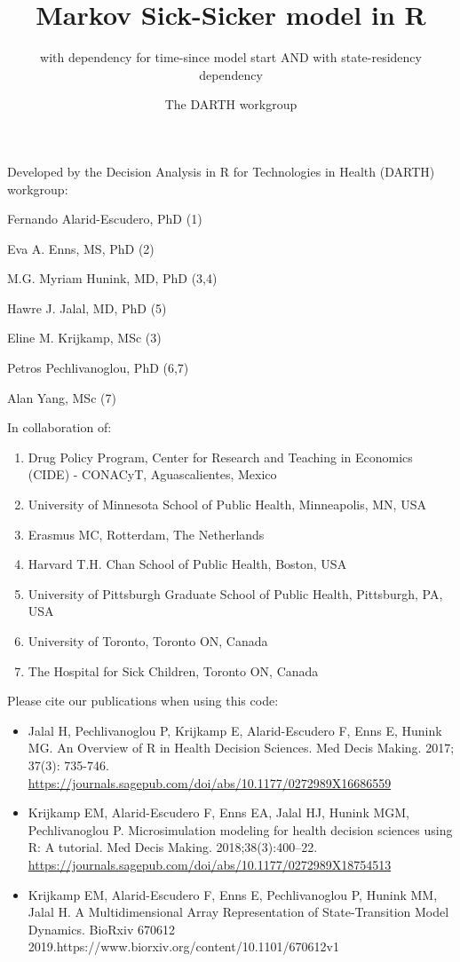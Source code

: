 \documentclass[
]{article}
\title{Markov Sick-Sicker model in R}
\subtitle{with dependency for time-since model start AND with state-residency
dependency}
\author{The DARTH workgroup}
\date{}
\providecommand{\tightlist}{%
  \setlength{\itemsep}{0pt}\setlength{\parskip}{0pt}}
\begin{document}
\maketitle

Developed by the Decision Analysis in R for Technologies in Health
(DARTH) workgroup:

Fernando Alarid-Escudero, PhD (1)

Eva A. Enns, MS, PhD (2)

M.G. Myriam Hunink, MD, PhD (3,4)

Hawre J. Jalal, MD, PhD (5)

Eline M. Krijkamp, MSc (3)

Petros Pechlivanoglou, PhD (6,7)

Alan Yang, MSc (7)

In collaboration of:

\begin{enumerate}
\def\labelenumi{\arabic{enumi}.}
\tightlist
\item
  Drug Policy Program, Center for Research and Teaching in Economics
  (CIDE) - CONACyT, Aguascalientes, Mexico
\item
  University of Minnesota School of Public Health, Minneapolis, MN, USA
\item
  Erasmus MC, Rotterdam, The Netherlands
\item
  Harvard T.H. Chan School of Public Health, Boston, USA
\item
  University of Pittsburgh Graduate School of Public Health, Pittsburgh,
  PA, USA
\item
  University of Toronto, Toronto ON, Canada
\item
  The Hospital for Sick Children, Toronto ON, Canada
\end{enumerate}

Please cite our publications when using this code:

\begin{itemize}
\item
  Jalal H, Pechlivanoglou P, Krijkamp E, Alarid-Escudero F, Enns E,
  Hunink MG. An Overview of R in Health Decision Sciences. Med Decis
  Making. 2017; 37(3): 735-746.
  \url{https://journals.sagepub.com/doi/abs/10.1177/0272989X16686559}
\item
  Krijkamp EM, Alarid-Escudero F, Enns EA, Jalal HJ, Hunink MGM,
  Pechlivanoglou P. Microsimulation modeling for health decision
  sciences using R: A tutorial. Med Decis Making. 2018;38(3):400--22.
  \url{https://journals.sagepub.com/doi/abs/10.1177/0272989X18754513}
\item
  Krijkamp EM, Alarid-Escudero F, Enns E, Pechlivanoglou P, Hunink MM,
  Jalal H. A Multidimensional Array Representation of State-Transition
  Model Dynamics. BioRxiv 670612
  2019.https://www.biorxiv.org/content/10.1101/670612v1
\end{itemize}
\end{document}
